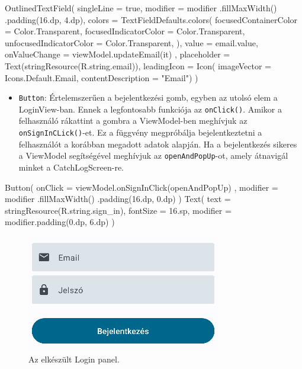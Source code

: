 \begin{java}[caption = {Az OutlinedTextField szemléltetése.}]
OutlinedTextField(
        singleLine = true,
        modifier = modifier
            .fillMaxWidth()
            .padding(16.dp, 4.dp),
        colors = TextFieldDefaults.colors(
            focusedContainerColor = Color.Transparent,
            focusedIndicatorColor = Color.Transparent,
            unfocusedIndicatorColor = Color.Transparent,
        ),
        value = email.value,
        onValueChange = { viewModel.updateEmail(it) },
        placeholder = { Text(stringResource(R.string.email))},
        leadingIcon = { Icon(
            imageVector = Icons.Default.Email,
            contentDescription = "Email") }
        )
\end{java}
\newpage
\begin{itemize}
    \item \texttt{Button}: Értelemszerűen a bejelentkezési gomb, egyben az utolsó elem a 
    \newline
    LoginView-ban. Ennek a legfontosabb funkciója az \texttt{onClick()}. Amikor a felhasználó rákattint a gombra a ViewModel-ben meghívjuk az \texttt{onSignInCLick()}-et.
    Ez a függvény megpróbálja bejelentkeztetni a felhasználót a korábban megadott adatok alapján. Ha a bejelentkezés sikeres a ViewModel segítségével meghívjuk az \texttt{openAndPopUp}-ot, amely átnavigál minket a CatchLogScreen-re.
\end{itemize}


\begin{java}[caption = {A Button szemléltetése.}]
Button(
         onClick = { viewModel.onSignInClick(openAndPopUp) },
        modifier = modifier
            .fillMaxWidth()
            .padding(16.dp, 0.dp)
    ) {
        Text(
            text = stringResource(R.string.sign_in),
            fontSize = 16.sp,
            modifier = modifier.padding(0.dp, 6.dp)
        )
    }
\end{java}

\begin{figure} [h]
    \centering
    \includegraphics[width=0.5\linewidth]{images/login.png}
    \caption{Az elkészült Login panel.}
    \label{fig:finishedlogin}
\end{figure}

